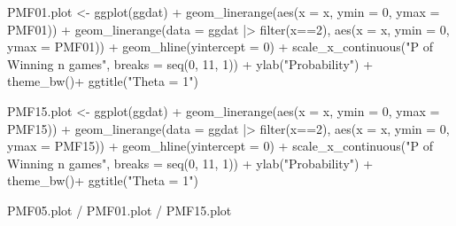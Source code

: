 \documentclass[
]{article}
\newenvironment{Shaded}{\begin{snugshade}}{\end{snugshade}}
\newcommand{\AttributeTok}[1]{\textcolor[rgb]{0.40,0.45,0.13}{#1}}
\newcommand{\DecValTok}[1]{\textcolor[rgb]{0.68,0.00,0.00}{#1}}
\newcommand{\FunctionTok}[1]{\textcolor[rgb]{0.28,0.35,0.67}{#1}}
\newcommand{\NormalTok}[1]{\textcolor[rgb]{0.00,0.23,0.31}{#1}}
\newcommand{\OtherTok}[1]{\textcolor[rgb]{0.00,0.23,0.31}{#1}}
\newcommand{\SpecialCharTok}[1]{\textcolor[rgb]{0.37,0.37,0.37}{#1}}
\newcommand{\StringTok}[1]{\textcolor[rgb]{0.13,0.47,0.30}{#1}}
\begin{document}
\begin{Shaded}
\begin{Highlighting}[numbers=left,,]
\NormalTok{PMF01.plot }\OtherTok{\textless{}{-}} \FunctionTok{ggplot}\NormalTok{(ggdat) }\SpecialCharTok{+}
\FunctionTok{geom\_linerange}\NormalTok{(}\FunctionTok{aes}\NormalTok{(}\AttributeTok{x =}\NormalTok{ x, }\AttributeTok{ymin =} \DecValTok{0}\NormalTok{, }\AttributeTok{ymax =}\NormalTok{ PMF01)) }\SpecialCharTok{+}
\FunctionTok{geom\_linerange}\NormalTok{(}\AttributeTok{data =}\NormalTok{ ggdat }\SpecialCharTok{|\textgreater{}} \FunctionTok{filter}\NormalTok{(x}\SpecialCharTok{==}\DecValTok{2}\NormalTok{),}
\FunctionTok{aes}\NormalTok{(}\AttributeTok{x =}\NormalTok{ x, }\AttributeTok{ymin =} \DecValTok{0}\NormalTok{, }\AttributeTok{ymax =}\NormalTok{ PMF01)) }\SpecialCharTok{+}
\FunctionTok{geom\_hline}\NormalTok{(}\AttributeTok{yintercept =} \DecValTok{0}\NormalTok{) }\SpecialCharTok{+}
\FunctionTok{scale\_x\_continuous}\NormalTok{(}\StringTok{"P of Winning n games"}\NormalTok{,}
\AttributeTok{breaks =} \FunctionTok{seq}\NormalTok{(}\DecValTok{0}\NormalTok{, }\DecValTok{11}\NormalTok{, }\DecValTok{1}\NormalTok{)) }\SpecialCharTok{+}
\FunctionTok{ylab}\NormalTok{(}\StringTok{"Probability"}\NormalTok{) }\SpecialCharTok{+}
\FunctionTok{theme\_bw}\NormalTok{()}\SpecialCharTok{+}
\FunctionTok{ggtitle}\NormalTok{(}\StringTok{"Theta = 1"}\NormalTok{)}

\NormalTok{PMF15.plot }\OtherTok{\textless{}{-}} \FunctionTok{ggplot}\NormalTok{(ggdat) }\SpecialCharTok{+}
\FunctionTok{geom\_linerange}\NormalTok{(}\FunctionTok{aes}\NormalTok{(}\AttributeTok{x =}\NormalTok{ x, }\AttributeTok{ymin =} \DecValTok{0}\NormalTok{, }\AttributeTok{ymax =}\NormalTok{ PMF15)) }\SpecialCharTok{+}
\FunctionTok{geom\_linerange}\NormalTok{(}\AttributeTok{data =}\NormalTok{ ggdat }\SpecialCharTok{|\textgreater{}} \FunctionTok{filter}\NormalTok{(x}\SpecialCharTok{==}\DecValTok{2}\NormalTok{),}
\FunctionTok{aes}\NormalTok{(}\AttributeTok{x =}\NormalTok{ x, }\AttributeTok{ymin =} \DecValTok{0}\NormalTok{, }\AttributeTok{ymax =}\NormalTok{ PMF15)) }\SpecialCharTok{+}
\FunctionTok{geom\_hline}\NormalTok{(}\AttributeTok{yintercept =} \DecValTok{0}\NormalTok{) }\SpecialCharTok{+}
\FunctionTok{scale\_x\_continuous}\NormalTok{(}\StringTok{"P of Winning n games"}\NormalTok{,}
\AttributeTok{breaks =} \FunctionTok{seq}\NormalTok{(}\DecValTok{0}\NormalTok{, }\DecValTok{11}\NormalTok{, }\DecValTok{1}\NormalTok{)) }\SpecialCharTok{+}
\FunctionTok{ylab}\NormalTok{(}\StringTok{"Probability"}\NormalTok{) }\SpecialCharTok{+}
\FunctionTok{theme\_bw}\NormalTok{()}\SpecialCharTok{+}
\FunctionTok{ggtitle}\NormalTok{(}\StringTok{"Theta = 1"}\NormalTok{)}

\NormalTok{PMF05.plot }\SpecialCharTok{/}\NormalTok{ PMF01.plot }\SpecialCharTok{/}\NormalTok{ PMF15.plot}
\end{Highlighting}
\end{Shaded}
\end{document}
